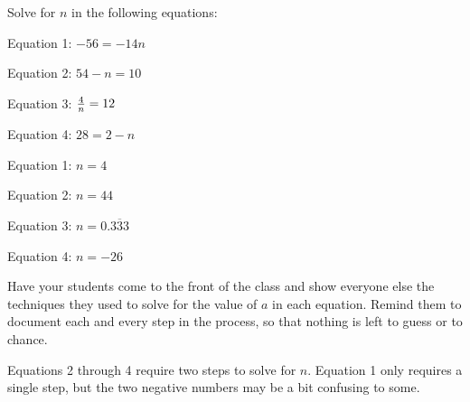 

Solve for $n$ in the following equations:

\vskip 10pt

Equation 1: $-56 = -14n$

\vskip 5pt

Equation 2: $54 - n = 10$

\vskip 5pt

Equation 3: ${4 \over n} = 12$

\vskip 5pt

Equation 4: $28 = 2 - n$

\vskip 10pt







Equation 1: $n = 4$

\vskip 5pt

Equation 2: $n = 44$

\vskip 5pt

Equation 3: $n = 0.\overline{333}$

\vskip 5pt

Equation 4: $n = -26$







Have your students come to the front of the class and show everyone else the techniques they used to solve for the value of $a$ in each equation.  Remind them to document each and every step in the process, so that nothing is left to guess or to chance.

Equations 2 through 4 require two steps to solve for $n$.  Equation 1 only requires a single step, but the two negative numbers may be a bit confusing to some.




